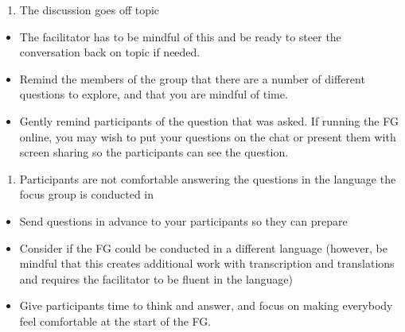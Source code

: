 \documentclass[
  english,
  letterpaper,
  DIV=11,
  numbers=noendperiod]{scrreprt}
\providecommand{\tightlist}{%
  \setlength{\itemsep}{0pt}\setlength{\parskip}{0pt}}
\begin{document}
\begin{enumerate}
\def\labelenumi{\arabic{enumi}.}
\setcounter{enumi}{2}
\tightlist
\item
  The discussion goes off topic
\end{enumerate}

\begin{tcolorbox}[enhanced jigsaw, breakable, bottomtitle=1mm, leftrule=.75mm, opacityback=0, colbacktitle=quarto-callout-caution-color!10!white, opacitybacktitle=0.6, toprule=.15mm, colback=white, left=2mm, coltitle=black, bottomrule=.15mm, titlerule=0mm, title={Suggested Solutions}, toptitle=1mm, colframe=quarto-callout-caution-color-frame, arc=.35mm, rightrule=.15mm]

\begin{itemize}
\tightlist
\item
  The facilitator has to be mindful of this and be ready to steer the
  conversation back on topic if needed.
\item
  Remind the members of the group that there are a number of different
  questions to explore, and that you are mindful of time.
\item
  Gently remind participants of the question that was asked. If running
  the FG online, you may wish to put your questions on the chat or
  present them with screen sharing so the participants can see the
  question.
\end{itemize}

\end{tcolorbox}

\begin{enumerate}
\def\labelenumi{\arabic{enumi}.}
\setcounter{enumi}{3}
\tightlist
\item
  Participants are not comfortable answering the questions in the
  language the focus group is conducted in
\end{enumerate}

\begin{tcolorbox}[enhanced jigsaw, breakable, bottomtitle=1mm, leftrule=.75mm, opacityback=0, colbacktitle=quarto-callout-caution-color!10!white, opacitybacktitle=0.6, toprule=.15mm, colback=white, left=2mm, coltitle=black, bottomrule=.15mm, titlerule=0mm, title={Suggested Solutions}, toptitle=1mm, colframe=quarto-callout-caution-color-frame, arc=.35mm, rightrule=.15mm]

\begin{itemize}
\tightlist
\item
  Send questions in advance to your participants so they can prepare
\item
  Consider if the FG could be conducted in a different language
  (however, be mindful that this creates additional work with
  transcription and translations and requires the facilitator to be
  fluent in the language)
\item
  Give participants time to think and answer, and focus on making
  everybody feel comfortable at the start of the FG.
\end{itemize}

\end{tcolorbox}
\end{document}

